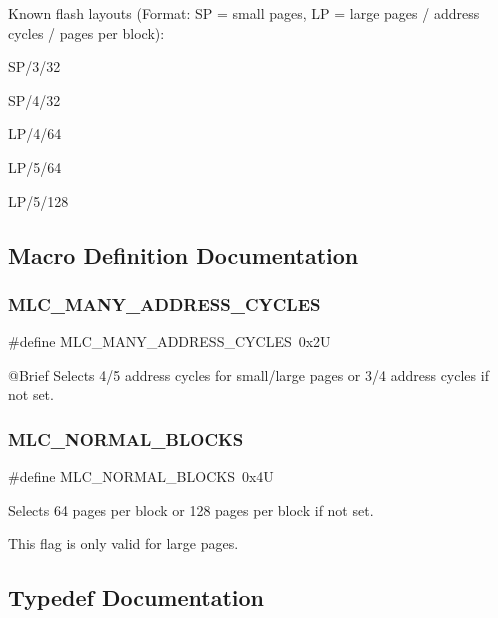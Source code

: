 Known flash layouts (Format\+: SP = small pages, LP = large pages / address cycles / pages per block)\+:


\begin{DoxyEnumerate}
\item S\+P/3/32
\item S\+P/4/32
\item L\+P/4/64
\item L\+P/5/64
\item L\+P/5/128 
\end{DoxyEnumerate}

\subsection{Macro Definition Documentation}
\mbox{\label{group__lpc32xx__nand__mlc_gaa02b2b76bde2195a15a66128a3643517}} 
\subsubsection{\texorpdfstring{MLC\_MANY\_ADDRESS\_CYCLES}{MLC\_MANY\_ADDRESS\_CYCLES}}
{\footnotesize\ttfamily \#define M\+L\+C\+\_\+\+M\+A\+N\+Y\+\_\+\+A\+D\+D\+R\+E\+S\+S\+\_\+\+C\+Y\+C\+L\+ES~0x2U}

@\+Brief Selects 4/5 address cycles for small/large pages or 3/4 address cycles if not set. \mbox{\label{group__lpc32xx__nand__mlc_ga438ea163775acc06c4b1d516aadb1d37}} 
\subsubsection{\texorpdfstring{MLC\_NORMAL\_BLOCKS}{MLC\_NORMAL\_BLOCKS}}
{\footnotesize\ttfamily \#define M\+L\+C\+\_\+\+N\+O\+R\+M\+A\+L\+\_\+\+B\+L\+O\+C\+KS~0x4U}



Selects 64 pages per block or 128 pages per block if not set. 

This flag is only valid for large pages. 

\subsection{Typedef Documentation}
\mbox{\label{group__lpc32xx__nand__mlc_ga8adf1c46b26e07838b729a78d83332ee}} 
